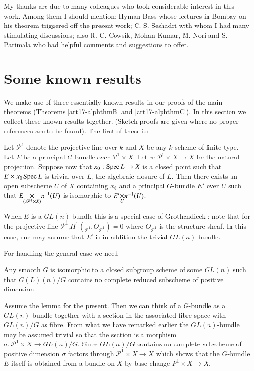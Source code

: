 My thanks are due to many colleagues who took considerable interest in this work. Among them I should mention: Hyman Bass whose lectures in Bombay on his theorem triggered off the present work; C. S. Seshadri with whom I had many stimulating discussions; also R. C. Cowsik, Mohan Kumar, M. Nori and S. Parimala who had helpful comments and suggestions to offer. 


\section{Some known results}\label{art17-sec2}
We make use of three essentially known results in our proofs of the main theorems (Theorems \ref{art17-alphthmB} and \ref{art17-alphthmC}). In this section we collect these known results together. (Sketch proofs are given where no proper references are to be found). The first of these is:

\begin{theorem}\label{art17-thm1}
Let $\mathscr{P}^1$ denote the projective line over $k$ and $X$ be any $k$-scheme of finite type. Let $E$ be a principal $G$-bundle  over $\mathscr{P}^{1} \times X$. Let $\pi: \mathscr{P}^1 \times X \to X$ be the natural projection. Suppose now that $x_0: \operatorname{Spec} L \to X$ is a closed point such that $E \times x_0 \operatorname{Spec} L$ is trivial over $\bar{L}$, the algebraic closure of $L$. Then there exists an open subscheme $U$ of $X$ containing $x_0$ and a principal $G$-bundle $E'$ over $U$ such that $\fprod{E}{\pi^{-1}(U)}{(\mathscr{P}^1 \times X)}$ is isomorphic to $\fprod{E'}{\pi^{-1}(U)}{U}$. 
\end{theorem}

When $E$ is a $GL(n)$-bundle this is a special case of Grothendieck \cite[Corollaire 4.6.4.]{art17-key4}: note that for the projective line $\mathscr{P}^1$,\pageoriginale $H^1 ({}_{\mathscr{P}^1}, O_{\mathscr{P}^1}) = 0$ where $O_{\mathscr{P}^1}$ is the structure sheaf. In this case, one may assume that $E'$ is in addition the trivial $GL(n)$-bundle.

For handling the general case we need

\begin{lemma*}
Any smooth $G$ is isomorphic to a closed subgroup scheme of some $GL(n)$ such that $G(L)(n)/G$ contains no complete reduced subscheme of positive dimension.
\end{lemma*}

Assume the lemma for the present. Then we can think of a $G$-bundle as a $GL(n)$-bundle together with a section in the associated fibre space with $GL(n)/G$ as fibre. From what we have remarked earlier the $GL(n)$-bundle may be assumed trivial so that the section is a morphism $\sigma: \mathscr{P}^1 \times X \to GL(n)/G$. Since $GL(n)/G$ contains no complete subscheme of positive dimension $\sigma$ factors through $\mathscr{P}^1 \times X \to X$ which shows that the $G$-bundle $E$ itself is obtained from a bundle on $X$ by base change $P^1 \times X \to X$.

